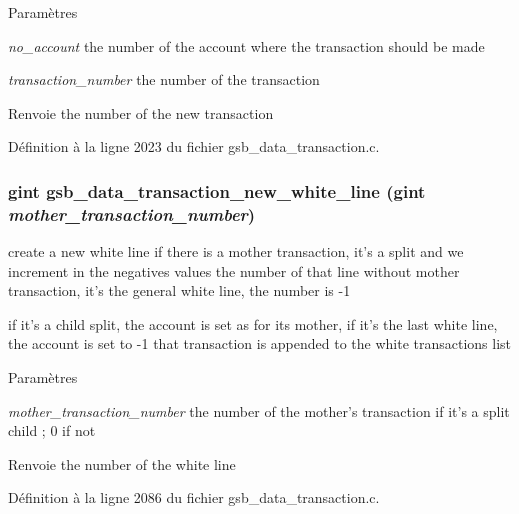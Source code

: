 \begin{DoxyParams}{Paramètres}
\item[{\em no\_\-account}]the number of the account where the transaction should be made \item[{\em transaction\_\-number}]the number of the transaction\end{DoxyParams}
\begin{DoxyReturn}{Renvoie}
the number of the new transaction 
\end{DoxyReturn}


Définition à la ligne 2023 du fichier gsb\_\-data\_\-transaction.c.

\subsubsection[{gsb\_\-data\_\-transaction\_\-new\_\-white\_\-line}]{\setlength{\rightskip}{0pt plus 5cm}gint gsb\_\-data\_\-transaction\_\-new\_\-white\_\-line (gint {\em mother\_\-transaction\_\-number})}\label{gsb__data__transaction_8h_a06ebb4be3d0f5e8ca2a53bbb74fb6ef8}
create a new white line if there is a mother transaction, it's a split and we increment in the negatives values the number of that line without mother transaction, it's the general white line, the number is -\/1

if it's a child split, the account is set as for its mother, if it's the last white line, the account is set to -\/1 that transaction is appended to the white transactions list


\begin{DoxyParams}{Paramètres}
\item[{\em mother\_\-transaction\_\-number}]the number of the mother's transaction if it's a split child ; 0 if not\end{DoxyParams}
\begin{DoxyReturn}{Renvoie}
the number of the white line 
\end{DoxyReturn}


Définition à la ligne 2086 du fichier gsb\_\-data\_\-transaction.c.

